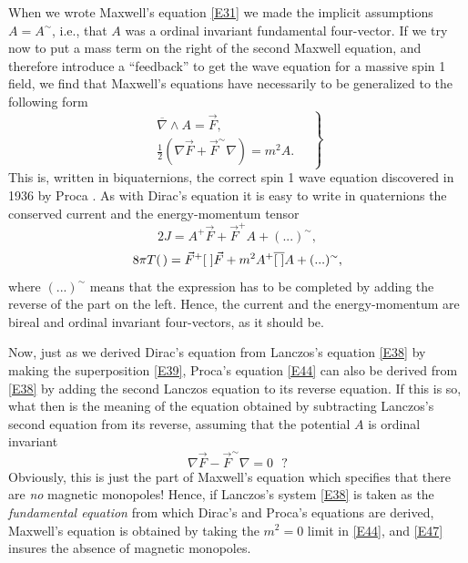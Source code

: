 \documentclass [12pt,a4paper      ]{article}
\newcommand{\CON}{\overline}          %
\newcommand{\vect}{\wedge}            %
\newcommand{\Q}{[\hspace{1.mm}]} %
\newcommand{\A}{(\hspace{.5mm})} %
\newcommand{\REV}{\sim}               %
\begin{document}
     When  we wrote Maxwell's equation \eqref{E31} we made the  implicit 
assumptions $A=A^\REV$, i.e.,  that  $A$  was  a ordinal invariant 
fundamental  four-vector.   If we try now to put a mass term on  the 
right  of the second Maxwell equation,  and therefore introduce a 
``feedback''  to get the wave equation for a massive spin 1  field, 
we find  that  Maxwell's equations have necessarily to be  generalized  to  the 
following form
%
\begin{equation}\label{E44}
\left.
\begin{array}{c}
\CON{\nabla} \vect A  =  \vec{F}, \\
\tfrac{1}{2} (\nabla \vec{F}  + \vec{F}^\REV \nabla) = m^2  A.
\end{array}
\quad \right\}
\end{equation}
%
This  is,  written  in  biquaternions,  the correct spin  1  wave 
equation  discovered in  1936  by Proca \cite{R34}.   As  with  Dirac's 
equation it is easy to write in quaternions the conserved current  
and  the energy-momentum tensor
%
\begin{equation}\label{E45}
              2  J  =  A^+ \vec{F}  +  \vec{F}^+ A  +  (...)^\REV,  %
\end{equation}
%
\begin{equation}\label{E46}
   8 \pi T\A = \vec{F}^+\Q \vec{F} + m^2 A^+\CON{\Q} A + (...)^\REV, %
\end{equation}
%
where $(...)^\REV$ means that  the expression  has to be completed  by 
adding the reverse of the part on the left.  Hence, the 
current  and the energy-momentum are bireal and ordinal invariant 
four-vectors, as it should be.

       Now,  just  as we derived Dirac's equation  from  Lanczos's 
equation \eqref{E38} by making the superposition \eqref{E39},  Proca's equation 
\eqref{E44}  can also be derived from \eqref{E38} by adding the second Lanczos 
equation to its reverse equation.  If this is so,  what then  is 
the  meaning  of the equation obtained by subtracting  Lanczos's 
second  equation from its reverse,  assuming  that  the 
potential $A$ is ordinal invariant
%
\begin{equation}\label{E47}
             \nabla \vec{F} -  \vec{F}^\REV \nabla  = 0    ~~~?    %
\end{equation}
%
Obviously,  this  is just the part of Maxwell's  equation  which 
specifies  that  there  are \emph{no} magnetic  monopoles!   Hence,  if 
{Lanczos's} system \eqref{E38} is taken as the \emph{fundamental equation} from 
which  Dirac's  and  Proca's  equations  are  derived,  Maxwell's 
equation  is obtained by taking the $m^2 =0$ limit in \eqref{E44},  and 
\eqref{E47} insures the absence of magnetic monopoles.
\end{document}

